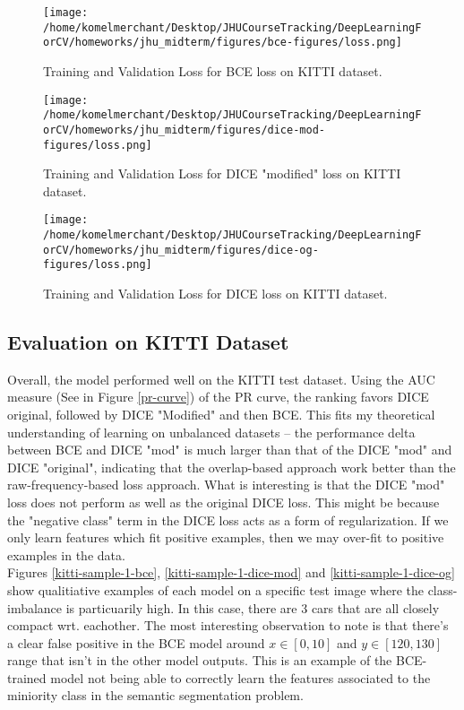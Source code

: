 \documentclass[Location Location Location! : Exploring Image Segmentation Problem In Urban Driving Scenarios]{IEEEtran}
\begin{document}
\begin{figure}[htbp]
\centerline{\texttt{[image: /home/komelmerchant/Desktop/JHUCourseTracking/DeepLearningForCV/homeworks/jhu\_midterm/figures/bce-figures/loss.png]}}
\caption{Training and Validation Loss for BCE loss on KITTI dataset.}
\label{bce-loss}
\end{figure}


\begin{figure}[htbp]
\centerline{\texttt{[image: /home/komelmerchant/Desktop/JHUCourseTracking/DeepLearningForCV/homeworks/jhu\_midterm/figures/dice-mod-figures/loss.png]}}
\caption{Training and Validation Loss for DICE "modified" loss on KITTI dataset.}
\label{dice-mod-loss}
\end{figure}


\begin{figure}[htbp]
\centerline{\texttt{[image: /home/komelmerchant/Desktop/JHUCourseTracking/DeepLearningForCV/homeworks/jhu\_midterm/figures/dice-og-figures/loss.png]}}
\caption{Training and Validation Loss for DICE loss on KITTI dataset.}
\label{dice-og-loss}
\end{figure}




\subsection{Evaluation on KITTI Dataset}
 
 

Overall, the model performed well on the KITTI test dataset. Using the AUC measure (See in Figure \ref{pr-curve}) of the PR curve, the ranking favors DICE original, followed by DICE "Modified" and then BCE. This fits my theoretical understanding of learning on unbalanced datasets -- the performance delta between BCE and DICE "mod" is much larger than that of the  DICE "mod" and DICE "original", indicating that the overlap-based approach work better than the raw-frequency-based loss approach. What is interesting is that the DICE "mod" loss does not perform as well as the original DICE loss. This might be because the "negative class" term in the DICE loss acts as a form of regularization. If we only learn features which fit positive examples, then we may over-fit to positive examples in the data.  
\\

Figures \ref{kitti-sample-1-bce}, \ref{kitti-sample-1-dice-mod} and \ref{kitti-sample-1-dice-og} show qualitiative examples of each model on a specific test image where the class-imbalance is particuarily high. In this case, there are 3 cars that are all closely compact wrt. eachother. The most interesting observation to note is that there's a clear false positive in the BCE model around $x \in [0, 10]$ and $y \in [120, 130]$ range that isn't in the other model outputs. This is an example of the BCE-trained model not being able to correctly learn the features associated to the miniority class in the semantic segmentation problem.
\end{document}
